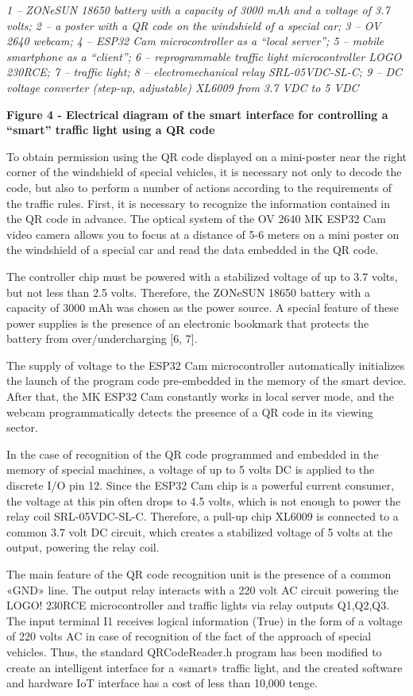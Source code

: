 \emph{1 -- ZONeSUN 18650 battery with a capacity of 3000 mAh and a
voltage of 3.7 volts; 2 -- a poster with a QR code on the windshield of
a special car; 3 -- OV 2640 webcam; 4 -- ESP32 Cam microcontroller as a
``local server''; 5 -- mobile smartphone as a ``client''; 6 --
reprogrammable traffic light microcontroller LOGO 230RCE; 7 -- traffic
light; 8 -- electromechanical relay SRL-05VDC-SL-C; 9 -- DC voltage
converter (step-up, adjustable) XL6009 from 3.7 VDC to 5 VDC}

\textbf{Figure 4 - Electrical diagram of the smart interface for
controlling a ``smart'' traffic light using a QR code}

To obtain permission using the QR code displayed on a mini-poster near
the right corner of the windshield of special vehicles, it is necessary
not only to decode the code, but also to perform a number of actions
according to the requirements of the traffic rules. First, it is
necessary to recognize the information contained in the QR code in
advance. The optical system of the OV 2640 MK ESP32 Cam video camera
allows you to focus at a distance of 5-6 meters on a mini poster on the
windshield of a special car and read the data embedded in the QR code.

The controller chip must be powered with a stabilized voltage of up to
3.7 volts, but not less than 2.5 volts. Therefore, the ZONeSUN 18650
battery with a capacity of 3000 mAh was chosen as the power source. A
special feature of these power supplies is the presence of an electronic
bookmark that protects the battery from over/undercharging {[}6, 7{]}.

The supply of voltage to the ESP32 Cam microcontroller automatically
initializes the launch of the program code pre-embedded in the memory of
the smart device. After that, the MK ESP32 Cam constantly works in local
server mode, and the webcam programmatically detects the presence of a
QR code in its viewing sector.

In the case of recognition of the QR code programmed and embedded in the
memory of special machines, a voltage of up to 5 volts DC is applied to
the discrete I/O pin 12. Since the ESP32 Cam chip is a powerful current
consumer, the voltage at this pin often drops to 4.5 volts, which is not
enough to power the relay coil SRL-05VDC-SL-C. Therefore, a pull-up chip
XL6009 is connected to a common 3.7 volt DC circuit, which creates a
stabilized voltage of 5 volts at the output, powering the relay coil.

The main feature of the QR code recognition unit is the presence of a
common «GND» line. The output relay interacts with a 220 volt AC circuit
powering the LOGO! 230RCE microcontroller and traffic lights via relay
outputs Q1,Q2,Q3. The input terminal I1 receives logical information
(True) in the form of a voltage of 220 volts AC in case of recognition
of the fact of the approach of special vehicles. Thus, the standard
QRCodeReader.h program has been modified to create an intelligent
interface for a «smart» traffic light, and the created software and
hardware IoT interface has a cost of less than 10,000 tenge.

